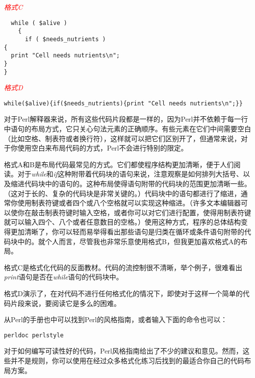 \textcolor{red}{\textit{格式C}}
\begin{adjustwidth}{4em}{}
\begin{lstlisting}
  while ( $alive )
    {
      if ( $needs_nutrients )
{
  print "Cell needs nutrients\n";
}
}
\end{lstlisting}
\end{adjustwidth}

\textcolor{red}{\textit{格式D}}
\begin{adjustwidth}{4em}{}
\begin{lstlisting}
while($alive){if($needs_nutrients){print "Cell needs nutrients\n";}}
\end{lstlisting}
\end{adjustwidth}

对于Perl解释器来说，所有这些代码片段都是一样的，因为Perl并不依赖于每一行中语句的布局方式，它只关心句法元素的正确顺序。有些元素在它们中间需要空白（比如空格、制表符或者换行符），这样就可以把它们区别开了，但通常来说，对于你使用空白来布局代码的方式，Perl不会进行特别的限定。

格式A和B是布局代码最常见的方式。它们都使程序结构更加清晰，便于人们阅读。对于\textit{while}和\textit{if}这种附带着代码块的语句来说，注意观察是如何排列大括号、以及缩进代码块中的语句的。这种布局使得语句附带的代码块的范围更加清晰一些。（这对于长的、复杂的代码块是非常关键的。）代码块中的语句都进行了缩进，通常你使用制表符键或者四个或八个空格就可以实现这种缩进。（许多文本编辑器可以使你在敲击制表符键时输入空格，或者你可以对它们进行配置，使得用制表符键就可以输入四个、八个或者任意数目的空格。）使用这种方式，程序的总体结构变得更加清晰了，你可以轻而易举得看出那些语句是归类在循环或条件语句附带的代码块中的。就个人而言，尽管我也非常乐意使用格式B，但我更加喜欢格式A的布局。

格式C是格式化代码的反面教材。代码的流控制很不清晰，举个例子，很难看出\textit{print}语句是否在\textit{while}语句的代码块中。

格式D演示了，在对代码不进行任何格式化的情况下，即使对于这样一个简单的代码片段来说，要阅读它是多么的困难。

从Perl的手册也中可以找到Perl的风格指南，或者输入下面的命令也可以：

\begin{lstlisting}
perldoc perlstyle
\end{lstlisting}

对于如何编写可读性好的代码，Perl风格指南给出了不少的建议和意见。然而，这些并不是规则，你可以使用在经过众多格式化练习后找到的最适合你自己的代码布局方案。

